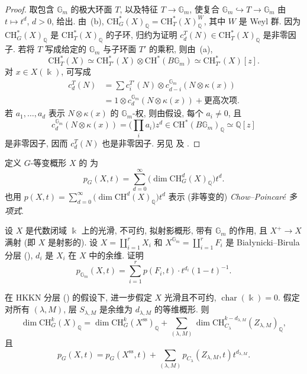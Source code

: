 \begin{proof}
取包含 $\mathbb G_m$ 的极大环面 $T$, 以及特征 $T\to\mathbb G_m$, 使复合 $\mathbb G_m\hookrightarrow T\to\mathbb G_m$ 由 $t\mapsto t^d$, $d>0$, 给出. 由~(b), $\mathrm{CH}_G^*(X)_{\mathbb Q}=\mathrm{CH}_T^*(X)_{\mathbb Q}^W$, 其中 $W$ 是 Weyl 群. 因为 $\mathrm{CH}_G^*(X)_{\mathbb Q}$ 是 $\mathrm{CH}_T^*(X)_{\mathbb Q}$ 的子环, 归约为证明 $c_d^T(N)\in\mathrm{CH}_T^*(X)_{\mathbb Q}$ 是非零因子. 若将 $T$ 写成给定的 $\mathbb G_m$ 与子环面 $T'$ 的乘积, 则由~(a),
\[
\mathrm{CH}_T^*(X)\simeq\mathrm{CH}_{T'}^*(X)\otimes\mathrm{CH}^*(B\mathbb G_m)\simeq\mathrm{CH}_{T'}^*(X)[z].
\]
对 $x\in X(\Bbbk)$, 可写成
\begin{align*}
c_d^T(N)&=\sum c_i^{T'}(N)\otimes c_{d-i}^{\mathbb G_m}(N\otimes\kappa(x))\\
&=1\otimes c_d^{\mathbb G_m}(N\otimes\kappa(x))+\text{更高次项}.
\end{align*}
若 $a_1,\ldots,a_d$ 表示 $N\otimes\kappa(x)$ 的 $\mathbb G_m$-权, 则由假设, 每个 $a_i\ne0$, 且
\[
c_d^{\mathbb G_m}(N\otimes\kappa(x))=\Big(\prod_i a_i\Big)z^d\in\mathrm{CH}^*(B\mathbb G_m)_{\mathbb Q}\simeq\mathbb Q[z]
\]
是非零因子, 因而 $c_d^T(N)$ 也是非零因子. 另见 \cite[命题 13.4]{AB83} 及 \cite[\S3.2]{Bri97}.
\end{proof}
定义 $G$-等变概形 $X$ 的 为
\[
p_G(X,t)=\sum_{d=0}^\infty\big(\dim\mathrm{CH}_G^d(X)_{\mathbb Q}\big)t^d.
\]
也用 $p(X,t)=\sum_{d=0}^\infty\big(\dim\mathrm{CH}^d(X)_{\mathbb Q}\big)t^d$ 表示 (非等变的) \textit{Chow--Poincaré 多项式}.
\begin{exercise}\label{src:8.7.12}
设 $X$ 是代数闭域 $\Bbbk$ 上的光滑, 不可约, 拟射影概形, 带有 $\mathbb G_m$ 的作用, 且 $X^+\to X$ 满射 (即 $X$ 是射影的). 设 $X=\coprod_{i=1}^rX_i$ 和 $X^{\mathbb G_m}=\coprod_{i=1}^rF_i$ 是 Białynicki--Birula 分层 (), $d_i$ 是 $X_i$ 在 $X$ 中的余维. 证明
\[
p_{\mathbb G_m}(X,t)=\sum_{i=1}^rp(F_i,t)\cdot t^{d_i}(1-t)^{-1}.
\]
\end{exercise}
\begin{proposition}\label{src:8.7.13}
在 HKKN 分层 () 的假设下, 进一步假定 $X$ 光滑且不可约, $\operatorname{char}(\Bbbk)=0$. 假定对所有 $(\lambda,M)$, 层 $S_{\lambda,M}$ 是余维为 $d_{\lambda,M}$ 的等维概形. 则
\[
\dim\mathrm{CH}_G^k(X)_{\mathbb Q}=\dim\mathrm{CH}_G^k(X^{\mathrm{ss}})_{\mathbb Q}+\sum_{(\lambda,M)}\dim\mathrm{CH}_{C_\lambda}^{k-d_{\lambda,M}}(Z_{\lambda,M})_{\mathbb Q},
\]
且
\[
p_G(X,t)=p_G(X^{\mathrm{ss}},t)+\sum_{(\lambda,M)}p_{C_\lambda}(Z_{\lambda,M},t)t^{d_{\lambda,M}}.
\]
\end{proposition}
